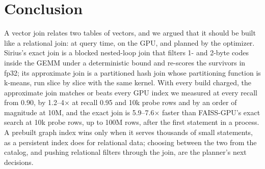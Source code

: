 \section{Conclusion}\label{sec:conclusion}

A vector join relates two tables of vectors, and we argued that it should be built like a relational join: at query time, on the GPU, and planned by the optimizer.
Sirius's exact join is a blocked nested-loop join that filters 1- and 2-byte codes inside the GEMM under a deterministic bound and re-scores the survivors in fp32; its approximate join is a partitioned hash join whose partitioning function is k-means, run slice by slice with the same kernel.
With every build charged, the approximate join matches or beats every GPU index we measured at every recall from 0.90, by 1.2--4$\times$ at recall 0.95 and 10k probe rows and by an order of magnitude at 10M, and the exact join is 5.9--7.6$\times$ faster than FAISS-GPU's exact search at 10k probe rows, up to 100M rows, after the first statement in a process.
A prebuilt graph index wins only when it serves thousands of small statements, as a persistent index does for relational data; choosing between the two from the catalog, and pushing relational filters through the join, are the planner's next decisions.
